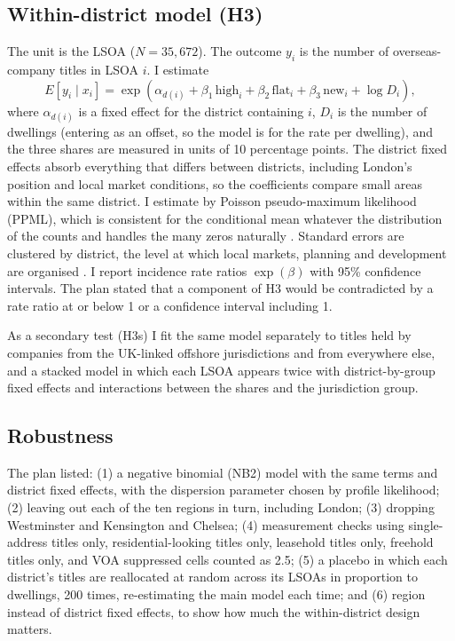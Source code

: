\documentclass[11pt,a4paper]{article}
\begin{document}
\subsection{Within-district model (H3)}
The unit is the LSOA ($N = 35,672$). The outcome $y_i$ is the number of overseas-company titles in LSOA $i$. I estimate
\begin{equation}
E[y_i \mid x_i] = \exp\left(\alpha_{d(i)} + \beta_1\,\textrm{high}_i + \beta_2\,\textrm{flat}_i + \beta_3\,\textrm{new}_i + \log D_i\right),
\end{equation}
where $\alpha_{d(i)}$ is a fixed effect for the district containing $i$, $D_i$ is the number of dwellings (entering as an offset, so the model is for the rate per dwelling), and the three shares are measured in units of 10 percentage points. The district fixed effects absorb everything that differs between districts, including London's position and local market conditions, so the coefficients compare small areas within the same district. I estimate by Poisson pseudo-maximum likelihood (PPML), which is consistent for the conditional mean whatever the distribution of the counts and handles the many zeros naturally \citep{santos2006,correia2020}. Standard errors are clustered by district, the level at which local markets, planning and development are organised \citep{cameron2015,abadie2023}. I report incidence rate ratios $\exp(\beta)$ with 95\% confidence intervals. The plan stated that a component of H3 would be contradicted by a rate ratio at or below 1 or a confidence interval including 1.

As a secondary test (H3s) I fit the same model separately to titles held by companies from the UK-linked offshore jurisdictions and from everywhere else, and a stacked model in which each LSOA appears twice with district-by-group fixed effects and interactions between the shares and the jurisdiction group.

\subsection{Robustness}
The plan listed: (1) a negative binomial (NB2) model with the same terms and district fixed effects, with the dispersion parameter chosen by profile likelihood; (2) leaving out each of the ten regions in turn, including London; (3) dropping Westminster and Kensington and Chelsea; (4) measurement checks using single-address titles only, residential-looking titles only, leasehold titles only, freehold titles only, and VOA suppressed cells counted as 2.5; (5) a placebo in which each district's titles are reallocated at random across its LSOAs in proportion to dwellings, 200 times, re-estimating the main model each time; and (6) region instead of district fixed effects, to show how much the within-district design matters.
\end{document}
